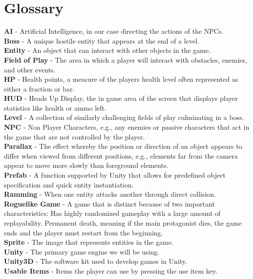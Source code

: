 \documentclass[12pt]{article}       %
\begin{document}
\newpage

\section{Glossary}
\label{sec:gloss}

{\bf{AI}} - Artificial Intelligence, in our case directing the actions of the NPCs. \\
{\bf Boss} - A unique hostile entity that appears at the end of a level. \\
{\bf Entity} - An object that can interact with other objects in the game. \\
{\bf Field of Play} - The area in which a player will interact with obstacles, enemies, and other events. \\
{\bf HP} - Health points, a measure of the players health level often represented as either a fraction or bar. \\
{\bf HUD} - Heads Up Display, the in game area of the screen that displays player statistics like health or ammo left. \\
{\bf Level} - A collection of similarly challenging fields of play culminating in a boss. \\
{\bf NPC} - Non Player Characters, e.g., any enemies or passive characters that act in the game that are not controlled by the player. \\
{\bf Parallax} - The effect whereby the position or direction of an object appears to differ when viewed from different positions, e.g., elements far from the camera appear to move more slowly than foreground elements. \\
{\bf Prefab} - A function supported by Unity that allows for predefined object specification and quick entity instantiation. \\
{\bf Ramming} - When one entity attacks another through direct collision. \\
{\bf Roguelike Game} - A game that is distinct because of two important characteristics:
Has highly randomized gameplay with a large amount of replayability. 
Permanent death, meaning if the main protagonist dies, the game ends and the player must restart from the beginning. \\
{\bf Sprite} - The image that represents entities in the game. \\
{\bf Unity} - The primary game engine we will be using. \\
{\bf Unity3D} - The software kit used to develop games in Unity. \\
{\bf Usable Items} - Items the player can use by pressing the use item key. \\
\end{document}
